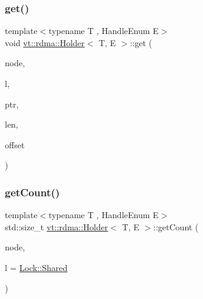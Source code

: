 \mbox{\label{structvt_1_1rdma_1_1_holder_a065715e0c91be9b411b490b740fc064a}} 
\subsubsection{\texorpdfstring{get()}{get()}}
{\footnotesize\ttfamily template$<$typename T , Handle\+Enum E$>$ \\
void \hyperlink{structvt_1_1rdma_1_1_holder}{vt\+::rdma\+::\+Holder}$<$ T, E $>$\+::get (\begin{DoxyParamCaption}\item[{\hyperlink{namespacevt_a866da9d0efc19c0a1ce79e9e492f47e2}{vt\+::\+Node\+Type}}]{node,  }\item[{\hyperlink{namespacevt_1_1rdma_ac5c20b41a653e520b6305d4d454ecb70}{Lock}}]{l,  }\item[{T $\ast$}]{ptr,  }\item[{std\+::size\+\_\+t}]{len,  }\item[{int}]{offset }\end{DoxyParamCaption})}

\mbox{\label{structvt_1_1rdma_1_1_holder_a13c46ec783f1df901cfd7db7f65e0e85}} 
\subsubsection{\texorpdfstring{get\+Count()}{getCount()}}
{\footnotesize\ttfamily template$<$typename T , Handle\+Enum E$>$ \\
std\+::size\+\_\+t \hyperlink{structvt_1_1rdma_1_1_holder}{vt\+::rdma\+::\+Holder}$<$ T, E $>$\+::get\+Count (\begin{DoxyParamCaption}\item[{\hyperlink{namespacevt_a866da9d0efc19c0a1ce79e9e492f47e2}{vt\+::\+Node\+Type}}]{node,  }\item[{\hyperlink{namespacevt_1_1rdma_ac5c20b41a653e520b6305d4d454ecb70}{Lock}}]{l = {\ttfamily \hyperlink{namespacevt_1_1rdma_ac5c20b41a653e520b6305d4d454ecb70aa6156ea9d66fef24e87e841fbabf7cca}{Lock\+::\+Shared}} }\end{DoxyParamCaption})}

